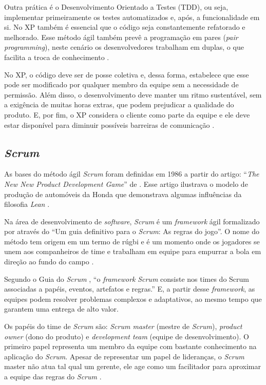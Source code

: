\documentclass[
    12pt,       %
    openright,      %
    twoside,      %
    a4paper,      %
    english,      %
    french,       %
    spanish,      %
    brazil,       %
    ]{abntex2}
\begin{document}
Outra prática é o Desenvolvimento Orientado a Testes (TDD), ou seja, implementar primeiramente os testes automatizados e, após, a funcionalidade em si. No XP também é essencial que o código seja constantemente refatorado e melhorado. Esse método ágil também prevê a programação em pares (\textit{pair programming}), neste cenário os desenvolvedores trabalham em duplas, o que facilita a troca de conhecimento \cite{SOMMERVILLE:2011}.

No XP, o código deve ser de posse coletiva e, dessa forma, estabelece que esse pode ser modificado por qualquer membro da equipe sem a necessidade de permissão. Além disso, o desenvolvimento deve manter um ritmo sustentável, sem a exigência de muitas horas extras, que podem prejudicar a qualidade do produto. E, por fim, o XP considera o cliente como parte da equipe e ele deve estar disponível para diminuir possíveis barreiras de comunicação \cite{WAZLAWICK:2013}.

\subsection{\textit{Scrum}}
As bases do método ágil \textit{Scrum} foram definidas em 1986 a partir do artigo: ``\textit{The New New Product Development Game}'' de . Esse artigo ilustrava o modelo de produção de automóveis da Honda que demonstrava algumas influências da filosofia \textit{Lean} \cite{WAZLAWICK:2013}.

Na área de desenvolvimento de \textit{software}, \textit{Scrum} é um \textit{framework} ágil formalizado por  através do ``Um guia definitivo para o \textit{Scrum}: As regras do jogo''. O nome do método tem origem em um termo de rúgbi e é um momento onde os jogadores se unem aos companheiros de time e trabalham em equipe para empurrar a bola em direção ao fundo do campo \cite{PRESSMAN:2011}. 

Segundo o Guia do \textit{Scrum} \cite{Sutherland:2013}, ``o \textit{framework} \textit{Scrum} consiste nos times do Scrum associadas a papéis, eventos, artefatos e
regras.'' E, a partir desse \textit{framework}, as equipes podem resolver problemas complexos e adaptativos, ao mesmo tempo que garantem uma entrega de alto valor. 

Os papéis do time de \textit{Scrum} são: \textit{Scrum master} (mestre de \textit{Scrum}), \textit{product owner} (dono do produto) e \textit{development team} (equipe de desenvolvimento). O primeiro papel representa um membro da equipe com bastante conhecimento na aplicação do \textit{Scrum}. Apesar de representar um papel de lideranças, o \textit{Scrum} master não atua tal qual um gerente, ele age como um facilitador para aproximar a equipe das regras do \textit{Scrum} \cite{WAZLAWICK:2013}.
\end{document}
